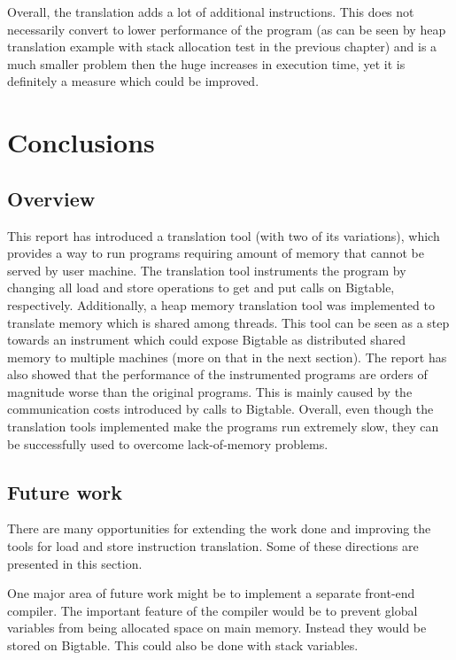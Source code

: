 \documentclass[bsc,frontabs,twoside,singlespacing,parskip,deptreport]{infthesis}     %
\begin{document}
Overall, the translation adds a lot of additional instructions. This does not necessarily convert to lower performance of the program (as can be seen by heap translation example with stack allocation test in the previous chapter) and is a much smaller problem then the huge increases in execution time, yet it is definitely a measure which could be improved.

\chapter{Conclusions}

\section{Overview}

This report has introduced a translation tool (with two of its variations), which provides a way to run programs requiring amount of memory that cannot be served by user machine. The translation tool instruments the program by changing all load and store operations to get and put calls on Bigtable, respectively. Additionally, a heap memory translation tool was implemented to translate memory which is shared among threads. This tool can be seen as a step towards an instrument which could expose Bigtable as distributed shared memory to multiple machines (more on that in the next section). The report has also showed that the performance of the instrumented programs are orders of magnitude worse than the original programs. This is mainly caused by the communication costs introduced by calls to Bigtable. Overall, even though the translation tools implemented make the programs run extremely slow, they can be successfully used to overcome lack-of-memory problems.

\section{Future work}

There are many opportunities for extending the work done and improving the tools for load and store instruction translation. Some of these directions are presented in this section.

One major area of future work might be to implement a separate front-end compiler. The important feature of the compiler would be to prevent global variables from being allocated space on main memory. Instead they would be stored on Bigtable. This could also be done with stack variables.
\end{document}
